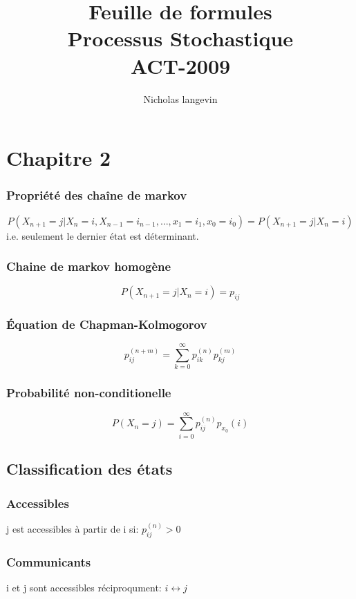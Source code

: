 \documentclass[13pt]{article}
\begin{document}
\title{Feuille de formules \\ Processus Stochastique \\ ACT-2009}
\author{Nicholas langevin}

\maketitle

\section*{Chapitre 2}

\subsubsection*{Propri\'et\'e des cha\^ine de markov}
\[ P( X_{n+1} = j|X_n = i, X_{n-1} = i_{n-1}, ... ,x_1 = i_1, x_0 = i_0) = P(X_{n+1} = j|X_n = i) \]
i.e. seulement le dernier \'etat est d\'eterminant.

\subsubsection*{Chaine de markov homogène}
\[ P(X_{n+1} = j|X_n = i) = p_{ij} \]

\subsubsection*{\'Equation de Chapman-Kolmogorov}
\[ p_{ij}^{(n+m)} = \sum_{k=0}^\infty p_{ik}^{(n)} p_{kj}^{(m)} \]

\subsubsection*{Probabilité non-conditionelle}
\[ P(X_n = j) = \sum_{i=0}^\infty p_{ij}^{(n)} p_{x_0}(i) \]

\subsection*{Classification des états}

\subsubsection*{Accessibles}
j est accessibles à partir de i si: $p_{ij}^{(n)} > 0$

\subsubsection*{Communicants}
i et j sont accessibles réciproqument: $i \leftrightarrow j$
\end{document}
